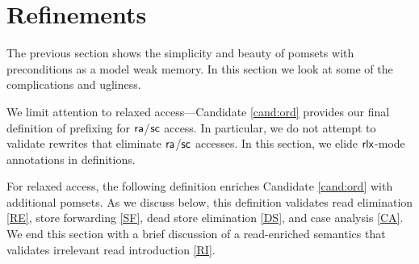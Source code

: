 \section{Refinements}
\label{sec:refine}

The previous section shows the simplicity and beauty of pomsets with
preconditions as a model weak memory.  In this section we look at some of the
complications and ugliness.

We limit attention to relaxed access---Candidate \ref{cand:ord} provides our
final definition of prefixing for ${\mathsf{ra}}$/${\mathsf{sc}}$ access.  In particular,
we do not attempt to validate rewrites that eliminate ${\mathsf{ra}}$/${\mathsf{sc}}$
accesses.  In this section, we elide ${\mathsf{rlx}}$-mode annotations in definitions.

For relaxed access, the following definition enriches Candidate
\ref{cand:ord} with additional pomsets.  As we discuss below, this definition
validates read elimination \eqref{RE}, store forwarding \eqref{SF}, dead
store elimination \eqref{DS}, and case analysis \eqref{CA}.  We end this
section with a brief discussion of a read-enriched semantics that validates
irrelevant read introduction \eqref{RI}.

